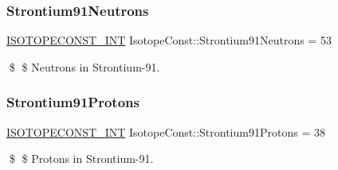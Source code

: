 \subsubsection{\texorpdfstring{Strontium91\+Neutrons}{Strontium91Neutrons}}
{\footnotesize\ttfamily \mbox{\hyperlink{group___isotope_const-_macros_ga5f18360b3e99483a35c32d789e62621c}{I\+S\+O\+T\+O\+P\+E\+C\+O\+N\+S\+T\+\_\+\+I\+NT}} Isotope\+Const\+::\+Strontium91\+Neutrons = 53}

\$ \$ Neutrons in Strontium-\/91. \mbox{\label{group___isotope_const-_strontium-_sr91_ga4e834567211891ce46c9802caf5ebc6d}} 
\subsubsection{\texorpdfstring{Strontium91\+Protons}{Strontium91Protons}}
{\footnotesize\ttfamily \mbox{\hyperlink{group___isotope_const-_macros_ga5f18360b3e99483a35c32d789e62621c}{I\+S\+O\+T\+O\+P\+E\+C\+O\+N\+S\+T\+\_\+\+I\+NT}} Isotope\+Const\+::\+Strontium91\+Protons = 38}

\$ \$ Protons in Strontium-\/91. 